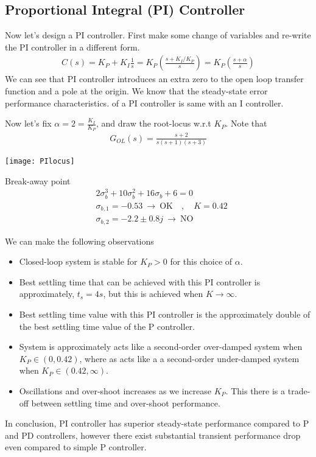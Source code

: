 \documentclass[twoside]{article}
\begin{document}
\subsection{Proportional Integral (PI) Controller}

Now let's design a PI controller. First make some change of
variables and re-write the PI controller in a different form.
%
\begin{align*}
 C(s) = K_P + K_I \frac{1}{s} = K_P \left( \frac{ s + K_I / K_P }{s}
  \right) = K_P \left( \frac{ s + \alpha }{s} \right)
\end{align*}
%
We can see that PI controller introduces an extra zero to the
open loop transfer function and a pole at the origin. 
We know that the steady-state error performance characteristics. 
of a PI controller is same with an I controller. 

Now let's fix $\alpha = 2 = \frac{K_I}{K_P}$, and draw 
the root-locus w.r.t $K_P$. Note that 
%
\begin{align*}
  G_{OL}(s) = \frac{s+2}{s (s+1) (s+3)}
\end{align*}


\begin{minipage}[h]{0.5\linewidth}
    \begin{center}
      \texttt{[image: PIlocus]}
    \end{center}
\end{minipage}
\begin{minipage}[h]{0.5\linewidth}
	Break-away point
	\begin{align*}
	& 2 \sigma_{b}^3 + 10 \sigma_{b}^2 + 16 \sigma_b + 6 = 0 
	\\
	& \sigma_{b,1} = - 0.53  \ \rightarrow \ \mathrm{OK} \quad ,
          \quad K = 0.42
	\\
	& \sigma_{b,2} =  -2.2 \pm 0.8 j \ \rightarrow \ \mathrm{NO}
	\end{align*}
\end{minipage}

We can make the following observations
%
\begin{itemize}
 \item Closed-loop system is stable for $K_P > 0$ for this choice of
   $\alpha$. 
  \item Best settling time that can be achieved with this PI controller
    is approximately, $t_{s} = 4 s$, but this is achieved when $K \to
    \infty$.
  \item Best settling time value with this PI controller is the
    approximately double of the best settling time value of the
    P controller.
  \item System is approximately acts like a second-order over-damped
   system when $K_P \in (0,0.42)$, where as acts like a a second-order 
   under-damped system when $K_P \in (0.42,\infty)$. 
   \item Oscillations and over-shoot increases as we increase $K_P$. 
   This there is a trade-off between settling time and over-shoot
   performance. 
\end{itemize}
% 
In conclusion, PI controller has superior steady-state performance
compared to P and PD controllers, however there exist substantial 
transient performance drop even compared to simple P controller. 
\end{document}
